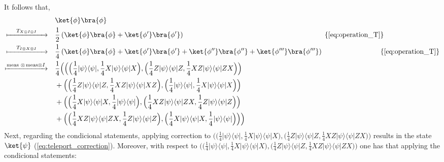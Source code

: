 It follows that,
  \begin{equation} \label{eq:teleport_T_part2}
    \begin{split}
    & \ket{\phi}\bra{\phi} \\
     \xmapsto{ \hspace{12pt} T_{X \otimes I \otimes I} \hspace{12pt} } \quad & \frac{1}{2} \left( \ket{\phi} \bra{\phi} + \ket{\phi'} \bra{\phi'}  \right) \hspace{200pt} \{\text{\autoref{eq:operation_T}}\}\\
    \xmapsto{ \hspace{12pt} T_{I \otimes X \otimes I} \hspace{12pt} } \quad & \frac{1}{4} \left( \ket{\phi} \bra{\phi} + \ket{\phi'} \bra{\phi'} + \ket{\phi''} \bra{\phi''} + \ket{\phi'''} \bra{\phi'''}  \right)  \hspace{82pt} \{\text{\autoref{eq:operation_T}}\}\\
    \xmapsto{ \text{meas } \otimes \hspace{1pt} \text{meas} \otimes  I} \quad & \frac{1}{4} \Big(\Big(\Big(\frac{1}{4} |\psi\rangle \langle \psi|, \frac{1}{4} X|\psi\rangle \langle \psi|X\Big),\Big(\frac{1}{4} Z|\psi\rangle \langle \psi|Z, \frac{1}{4}  XZ|\psi\rangle \langle \psi|ZX \Big)\Big) \\
    & + \Big(\Big(\frac{1}{4} Z|\psi\rangle \langle \psi|Z, \frac{1}{4} XZ|\psi\rangle \langle \psi|XZ\Big),\Big(\frac{1}{4} |\psi\rangle \langle \psi|, \frac{1}{4}  X|\psi\rangle \langle \psi|X \Big)\Big)\\
    & + \Big(\Big(\frac{1}{4} X|\psi\rangle \langle \psi|X, \frac{1}{4} |\psi\rangle \langle \psi|\Big),\Big(\frac{1}{4} XZ|\psi\rangle \langle \psi|ZX, \frac{1}{4}  Z|\psi\rangle \langle \psi|Z \Big)\Big) \\
   & + \Big(\Big(\frac{1}{4} XZ|\psi\rangle \langle \psi|ZX, \frac{1}{4} Z|\psi\rangle \langle \psi|Z\Big),\Big(\frac{1}{4} X|\psi\rangle \langle \psi|X, \frac{1}{4}  |\psi\rangle \langle \psi| \Big)\Big) \Big) \\    
    \end{split}
  \end{equation}
Next, regarding the condicional statements, applying correction to $\Big(\Big(\frac{1}{4} |\psi\rangle \langle \psi|, \frac{1}{4} X|\psi\rangle \langle \psi|X\Big),\Big(\frac{1}{4} Z|\psi\rangle \langle \psi|Z, \frac{1}{4}  XZ|\psi\rangle \langle \psi|ZX \Big)\Big) $ results in the state $\ket{\psi}$ (\autoref{eq:teleport_correction}). Moreover, with respect to  $\Big(\Big(\frac{1}{4} |\psi\rangle \langle \psi|, \frac{1}{4} X|\psi\rangle \langle \psi|X\Big),\Big(\frac{1}{4} Z|\psi\rangle \langle \psi|Z, \frac{1}{4}  XZ|\psi\rangle \langle \psi|ZX \Big)\Big) $ one has that applying the condicional statements: 

